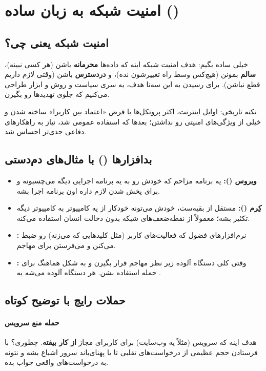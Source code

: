 
\section{امنیت شبکه به زبان ساده ()}
\subsection{امنیت شبکه یعنی چی؟}
خیلی ساده بگیم: هدف امنیت شبکه اینه که داده‌ها \textbf{محرمانه} باشن (هر کسی نبینه)، \textbf{سالم} بمونن (هیچ‌کس وسط راه تغییرشون نده)، و \textbf{دردسترس} باشن (وقتی لازم داریم قطع نباشن). برای رسیدن به این سه‌تا هدف، یه سری سیاست و روش و ابزار طراحی می‌کنیم که جلوی تهدیدها رو بگیرن.

نکته تاریخی: اوایل اینترنت، اکثر پروتکل‌ها با فرض «اعتماد بین کاربرا» ساخته شدن و خیلی از ویژگی‌های امنیتی رو نداشتن؛ بعدها که استفاده عمومی شد، نیاز به راهکارهای دفاعی جدی‌تر احساس شد.

\subsection{بدافزارها () با مثال‌های دم‌دستی}
\begin{itemize}
  \item \textbf{ویروس ():} یه برنامه مزاحم که خودش رو به یه برنامه اجرایی دیگه {می‌چسبونه} و برای پخش شدن لازم داره اون برنامه اجرا بشه.
  \item \textbf{کِرم ():} مستقل از بقیه‌ست، خودش می‌تونه {خودکار} از یه کامپیوتر به کامپیوتر دیگه تکثیر بشه؛ معمولاً از نقطه‌ضعف‌های شبکه بدون دخالت انسان استفاده می‌کنه.
  \item \textbf{:} نرم‌افزارهای فضول که فعالیت‌های کاربر (مثل کلیدهایی که می‌زنه) رو ضبط می‌کنن و می‌فرستن برای مهاجم.
  \item \textbf{:} وقتی کلی دستگاه آلوده زیر نظر مهاجم قرار بگیرن و به شکل هماهنگ برای حمله استفاده بشن. هر دستگاه آلوده می‌شه یه .
\end{itemize}

\subsection{حملات رایج با توضیح کوتاه}
\paragraph{حمله منع سرویس }
هدف اینه که سرویس (مثلاً یه وب‌سایت) برای کاربرای مجاز \textbf{از کار بیفته}. چطوری؟ با فرستادن حجم عظیمی از درخواست‌های تقلبی تا  یا پهنای‌باند سرور اشباع بشه و نتونه به درخواست‌های واقعی جواب بده.

